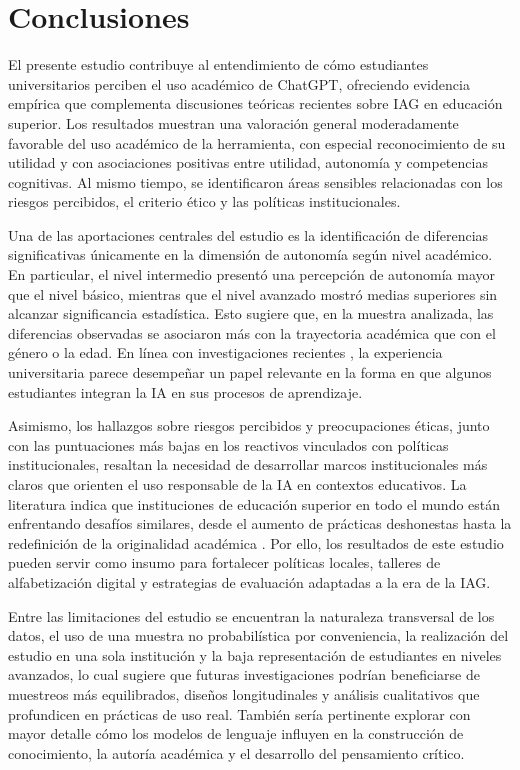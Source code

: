 \documentclass[spanish]{textolivre}
\begin{document}
\section{Conclusiones}

El presente estudio contribuye al entendimiento de cómo estudiantes universitarios perciben el uso académico de ChatGPT, ofreciendo evidencia empírica que complementa discusiones teóricas recientes sobre IAG en educación superior. Los resultados muestran una valoración general moderadamente favorable del uso académico de la herramienta, con especial reconocimiento de su utilidad y con asociaciones positivas entre utilidad, autonomía y competencias cognitivas. Al mismo tiempo, se identificaron áreas sensibles relacionadas con los riesgos percibidos, el criterio ético y las políticas institucionales.

Una de las aportaciones centrales del estudio es la identificación de diferencias significativas únicamente en la dimensión de autonomía según nivel académico. En particular, el nivel intermedio presentó una percepción de autonomía mayor que el nivel básico, mientras que el nivel avanzado mostró medias superiores sin alcanzar significancia estadística. Esto sugiere que, en la muestra analizada, las diferencias observadas se asociaron más con la trayectoria académica que con el género o la edad. En línea con investigaciones recientes \cite{Haq2025,Pitts2025}, la experiencia universitaria parece desempeñar un papel relevante en la forma en que algunos estudiantes integran la IA en sus procesos de aprendizaje.

Asimismo, los hallazgos sobre riesgos percibidos y preocupaciones éticas, junto con las puntuaciones más bajas en los reactivos vinculados con políticas institucionales, resaltan la necesidad de desarrollar marcos institucionales más claros que orienten el uso responsable de la IA en contextos educativos. La literatura indica que instituciones de educación superior en todo el mundo están enfrentando desafíos similares, desde el aumento de prácticas deshonestas hasta la redefinición de la originalidad académica \cite{Abdurrahim2025,Chen2024,Cotton2024,VanNiekerkDelportSutherland2025}. Por ello, los resultados de este estudio pueden servir como insumo para fortalecer políticas locales, talleres de alfabetización digital y estrategias de evaluación adaptadas a la era de la IAG.

Entre las limitaciones del estudio se encuentran la naturaleza transversal de los datos, el uso de una muestra no probabilística por conveniencia, la realización del estudio en una sola institución y la baja representación de estudiantes en niveles avanzados, lo cual sugiere que futuras investigaciones podrían beneficiarse de muestreos más equilibrados, diseños longitudinales y análisis cualitativos que profundicen en prácticas de uso real. También sería pertinente explorar con mayor detalle cómo los modelos de lenguaje influyen en la construcción de conocimiento, la autoría académica y el desarrollo del pensamiento crítico.
\end{document}
